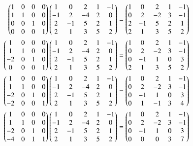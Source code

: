 \documentclass[journal,12pt,twocolumn]{IEEEtran}
\begin{document}
\begin{align} \nonumber
    \begin{pmatrix}1 & 0 & 0 & 0 \\
           1 & 1 & 0 & 0 \\
           0 & 0 & 1 & 0 \\
           0 & 0 & 0 & 1\end{pmatrix} \nonumber
    \begin{pmatrix}1 & 0 & 2 & 1 & -1 \\
           -1 & 2 & -4 & 2 & 0 \\
           2 & -1 & 5 & 2 & 1 \\
           2 & 1 & 3 & 5 & 2\end{pmatrix} =
    \begin{pmatrix}1 & 0 & 2 & 1 & -1 \\
           0 & 2 & -2 & 3 & -1 \\
           2 & -1 & 5 & 2 & 1 \\
           2 & 1 & 3 & 5 & 2\end{pmatrix} \\ \nonumber
    \begin{pmatrix}1 & 0 & 0 & 0 \\
           1 & 1 & 0 & 0 \\
           -2 & 0 & 1 & 0 \\
           0 & 0 & 0 & 1\end{pmatrix} 
    \begin{pmatrix}1 & 0 & 2 & 1 & -1 \\
           -1 & 2 & -4 & 2 & 0 \\
           2 & -1 & 5 & 2 & 1 \\
           2 & 1 & 3 & 5 & 2\end{pmatrix} =
    \begin{pmatrix}1 & 0 & 2 & 1 & -1 \\
           0 & 2 & -2 & 3 & -1 \\
           0 & -1 & 1 & 0 & 3 \\
           2 & 1 & 3 & 5 & 2\end{pmatrix} \\\nonumber
    \begin{pmatrix}1 & 0 & 0 & 0 \\
           1 & 1 & 0 & 0 \\
           -2 & 0 & 1 & 0 \\
           -2 & 0 & 0 & 1\end{pmatrix}
    \begin{pmatrix}1 & 0 & 2 & 1 & -1 \\
           -1 & 2 & -4 & 2 & 0 \\
           2 & -1 & 5 & 2 & 1 \\
           2 & 1 & 3 & 5 & 2\end{pmatrix} =
    \begin{pmatrix}1 & 0 & 2 & 1 & -1 \\
           0 & 2 & -2 & 3 & -1 \\
           0 & -1 & 1 & 0 & 3 \\
           0 & 1 & -1 & 3 & 4\end{pmatrix}\\ \nonumber
    \begin{pmatrix}1 & 0 & 0 & 0 \\
           1 & 1 & 0 & 0 \\
           -2 & 0 & 1 & 0 \\
           -4 & 0 & 1 & 1\end{pmatrix}
    \begin{pmatrix}1 & 0 & 2 & 1 & -1 \\
           -1 & 2 & -4 & 2 & 0 \\
           2 & -1 & 5 & 2 & 1 \\
           2 & 1 & 3 & 5 & 2\end{pmatrix} =
    \begin{pmatrix}1 & 0 & 2 & 1 & -1 \\
           0 & 2 & -2 & 3 & -1 \\
           0 & -1 & 1 & 0 & 3 \\
           0 & 0 & 0 & 3 & 7\end{pmatrix} \\ \nonumber
\end{align}
\end{document}
